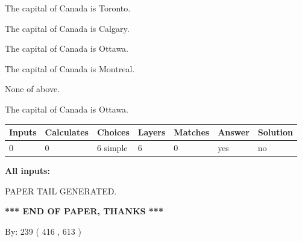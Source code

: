 \documentclass[12pt]{article}
\begin{document}
 
The capital of Canada is Toronto.
 
 
The capital of Canada is Calgary.
 
 
The capital of Canada is Ottawa.
 
 
The capital of Canada is Montreal.
 
 
 None of above.
 
 
\noindent{}
 
 
The capital of Canada is Ottawa.
 
 
\noindent{}
 
 
   
   
   
   
\noindent\begin{tabular}{|l|l|l|l|l|l|l|}
 \hline
Inputs & Calculates & Choices & Layers & Matches & Answer & Solution \\ \hline
 0  & 
 0  & 
 6
  simple  
  & 
 6  & 
 0  & 
  yes & 
  no 
  \\ \hline
 \end{tabular}
   
   
   
   
\noindent{}
   
   
   
   
\noindent\vspace{0.1in}\hspace{-0.08in} {\textbf{\Large{All inputs: }}}
   
   
   
   
   
   
 \vspace{0.2in}
 
   
   
\vspace{2.0in} PAPER TAIL GENERATED.
   
   
   
   
\vspace{1.0in} 
{\textbf{\large{ *** END OF PAPER, THANKS *** }}} 
   
   
\hspace{1.0in} By: 
 239 ( 416 ,  613 )
   
\end{document}
